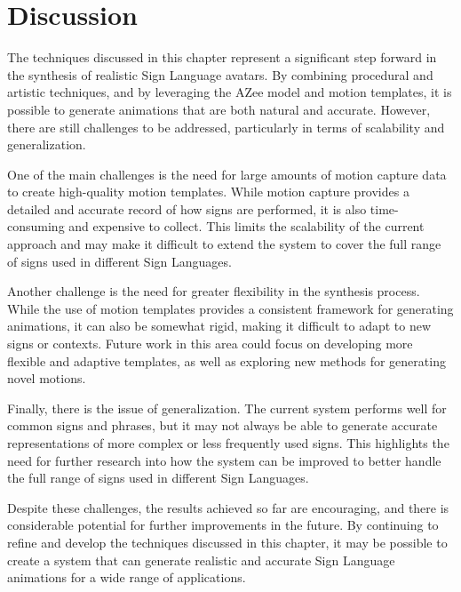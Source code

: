 \documentclass[../../main.tex]{subfiles}
\begin{document}
\section{Discussion}

The techniques discussed in this chapter represent a significant step forward in the synthesis of realistic Sign Language avatars. By combining procedural and artistic techniques, and by leveraging the AZee model and motion templates, it is possible to generate animations that are both natural and accurate. However, there are still challenges to be addressed, particularly in terms of scalability and generalization.

One of the main challenges is the need for large amounts of motion capture data to create high-quality motion templates. While motion capture provides a detailed and accurate record of how signs are performed, it is also time-consuming and expensive to collect. This limits the scalability of the current approach and may make it difficult to extend the system to cover the full range of signs used in different Sign Languages.

Another challenge is the need for greater flexibility in the synthesis process. While the use of motion templates provides a consistent framework for generating animations, it can also be somewhat rigid, making it difficult to adapt to new signs or contexts. Future work in this area could focus on developing more flexible and adaptive templates, as well as exploring new methods for generating novel motions.

Finally, there is the issue of generalization. The current system performs well for common signs and phrases, but it may not always be able to generate accurate representations of more complex or less frequently used signs. This highlights the need for further research into how the system can be improved to better handle the full range of signs used in different Sign Languages.

Despite these challenges, the results achieved so far are encouraging, and there is considerable potential for further improvements in the future. By continuing to refine and develop the techniques discussed in this chapter, it may be possible to create a system that can generate realistic and accurate Sign Language animations for a wide range of applications.
\end{document}
